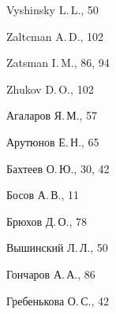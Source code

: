\begin{theindex}
  \item Vyshinsky L.\,L., 50





  \indexspace





  \item Zaltcman A.\,D., 102


  \item Zatsman I.\,M., 86, 94


  \item Zhukov D.\,O., 102










\newpage





  \indexspace





  \item Агаларов Я.\,М., 57


  \item Арутюнов Е.\,Н., 65





  \indexspace





  \item Бахтеев О.\,Ю., 30, 42


  \item Босов А.\,В., 11


  \item Брюхов Д.\,О., 78





  \indexspace





  \item Вышинский Л.\,Л., 50





  \indexspace





  \item Гончаров А.\,А., 86


  \item Гребенькова О.\,С., 42



\end{theindex}
